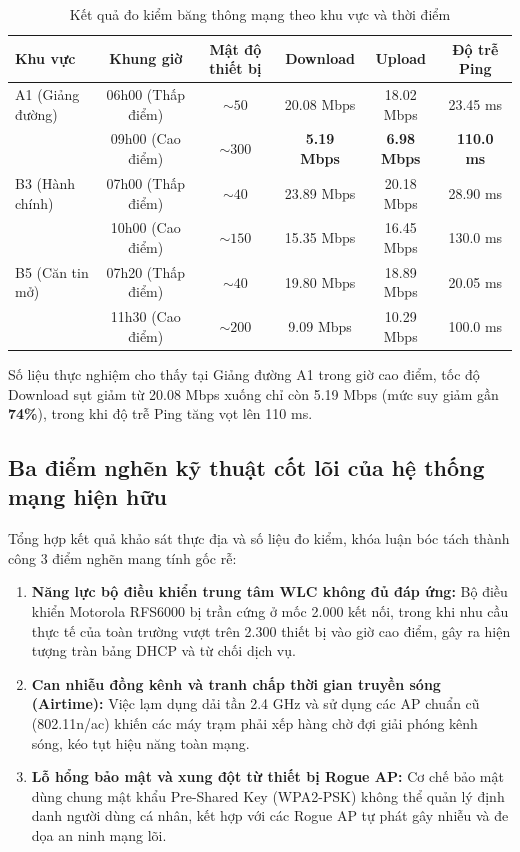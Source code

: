 \begin{table}[htbp]
\centering
\caption{Kết quả đo kiểm băng thông mạng theo khu vực và thời điểm}
\label{tab:speedtest}
\begin{tabular}{lccccc}
\toprule
\textbf{Khu vực} & \textbf{Khung giờ} & \textbf{Mật độ thiết bị} & \textbf{Download} & \textbf{Upload} & \textbf{Độ trễ Ping} \\
\midrule
A1 (Giảng đường) & 06h00 (Thấp điểm) & $\sim 50$ & 20.08 Mbps & 18.02 Mbps & 23.45 ms \\
                 & 09h00 (Cao điểm)  & $\sim 300$ & \textbf{5.19 Mbps} & \textbf{6.98 Mbps} & \textbf{110.0 ms} \\
\midrule
B3 (Hành chính)  & 07h00 (Thấp điểm) & $\sim 40$ & 23.89 Mbps & 20.18 Mbps & 28.90 ms \\
                 & 10h00 (Cao điểm)  & $\sim 150$ & 15.35 Mbps & 16.45 Mbps & 130.0 ms \\
\midrule
B5 (Căn tin mở)  & 07h20 (Thấp điểm) & $\sim 40$ & 19.80 Mbps & 18.89 Mbps & 20.05 ms \\
                 & 11h30 (Cao điểm)  & $\sim 200$ & 9.09 Mbps & 10.29 Mbps & 100.0 ms \\
\bottomrule
\end{tabular}
\end{table}

Số liệu thực nghiệm cho thấy tại Giảng đường A1 trong giờ cao điểm, tốc độ Download sụt giảm từ 20.08 Mbps xuống chỉ còn 5.19 Mbps (mức suy giảm gần \textbf{74\%}), trong khi độ trễ Ping tăng vọt lên 110 ms.

\subsection{Ba điểm nghẽn kỹ thuật cốt lõi của hệ thống mạng hiện hữu}

Tổng hợp kết quả khảo sát thực địa và số liệu đo kiểm, khóa luận bóc tách thành công 3 điểm nghẽn mang tính gốc rễ:
\begin{enumerate}
    \item \textbf{Năng lực bộ điều khiển trung tâm WLC không đủ đáp ứng:} Bộ điều khiển Motorola RFS6000 bị trần cứng ở mốc 2.000 kết nối, trong khi nhu cầu thực tế của toàn trường vượt trên 2.300 thiết bị vào giờ cao điểm, gây ra hiện tượng tràn bảng DHCP và từ chối dịch vụ.
    \item \textbf{Can nhiễu đồng kênh và tranh chấp thời gian truyền sóng (Airtime):} Việc lạm dụng dải tần 2.4 GHz và sử dụng các AP chuẩn cũ (802.11n/ac) khiến các máy trạm phải xếp hàng chờ đợi giải phóng kênh sóng, kéo tụt hiệu năng toàn mạng.
    \item \textbf{Lỗ hổng bảo mật và xung đột từ thiết bị Rogue AP:} Cơ chế bảo mật dùng chung mật khẩu Pre-Shared Key (WPA2-PSK) không thể quản lý định danh người dùng cá nhân, kết hợp với các Rogue AP tự phát gây nhiễu và đe dọa an ninh mạng lõi.
\end{enumerate}

